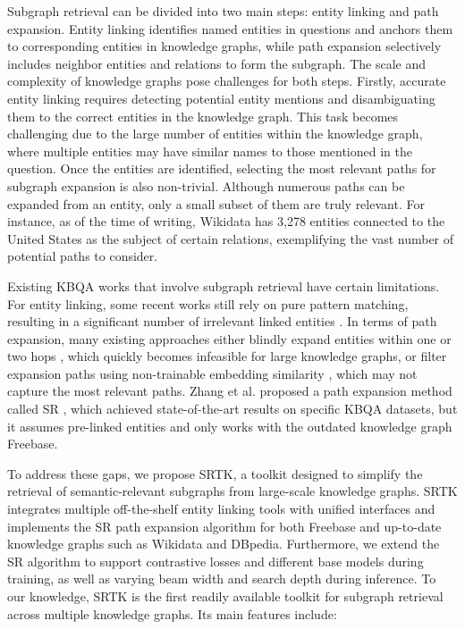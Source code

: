 \documentclass[runningheads]{llncs}
\begin{document}
Subgraph retrieval can be divided into two main steps: entity linking and path expansion. Entity linking identifies named entities in questions and anchors them to corresponding entities in knowledge graphs, while path expansion selectively includes neighbor entities and relations to form the subgraph. The scale and complexity of knowledge graphs pose challenges for both steps. Firstly, accurate entity linking requires detecting potential entity mentions and disambiguating them to the correct entities in the knowledge graph. This task becomes challenging due to the large number of entities within the knowledge graph, where multiple entities may have similar names to those mentioned in the question. Once the entities are identified, selecting the most relevant paths for subgraph expansion is also non-trivial. Although numerous paths can be expanded from an entity, only a small subset of them are truly relevant. For instance, as of the time of writing, Wikidata has 3,278 entities connected to the United States as the subject of certain relations, exemplifying the vast number of potential paths to consider.


Existing KBQA works that involve subgraph retrieval have certain limitations. For entity linking, some recent works still rely on pure pattern matching, resulting in a significant number of irrelevant linked entities \cite{yasunaga2022dragon,liu2021kgbart,das2022kgqacase}.  In terms of path expansion, many existing approaches either blindly expand entities within one or two hops \cite{chaudhuri2021grounding}, which quickly becomes infeasible for large knowledge graphs, or filter expansion paths using non-trainable embedding similarity \cite{yasunaga2021qagnn}, which may not capture the most relevant paths. Zhang et al. proposed a path expansion method called SR \cite{zhang2022ruckbqa}, which achieved state-of-the-art results on specific KBQA datasets, but it assumes pre-linked entities and only works with the outdated knowledge graph Freebase.

To address these gaps, we propose SRTK, a toolkit designed to simplify the retrieval of semantic-relevant subgraphs from large-scale knowledge graphs. SRTK integrates multiple off-the-shelf entity linking tools with unified interfaces and implements the SR path expansion algorithm \cite{zhang2022ruckbqa} for both Freebase and up-to-date knowledge graphs such as Wikidata and DBpedia. Furthermore, we extend the SR algorithm to support contrastive losses and different base models during training, as well as varying beam width and search depth during inference. To our knowledge, SRTK is the first readily available toolkit for subgraph retrieval across multiple knowledge graphs. Its main features include:
\end{document}
